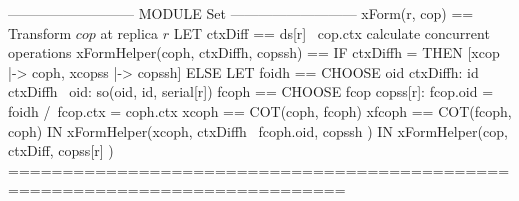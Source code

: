 \documentclass[preview, border={5pt 0pt 5pt 1pt}]{standalone}
\begin{document}
\begin{tla}
--------------------------- MODULE Set ---------------------------
xForm(r, cop) == \* Transform $cop$ at replica $r$
    LET ctxDiff == ds[r] \ cop.ctx \* calculate concurrent operations
        xFormHelper(coph, ctxDiffh, copssh) ==
            IF ctxDiffh = {} THEN [xcop |-> coph, xcopss |-> copssh]
            ELSE LET foidh == CHOOSE oid \in ctxDiffh:
                              \A id \in ctxDiffh \ {oid}: so(oid, id, serial[r]) 
                     fcoph == CHOOSE fcop \in copss[r]: 
                                fcop.oid = foidh /\ fcop.ctx = coph.ctx
                     xcoph == COT(coph, fcoph)
                    xfcoph == COT(fcoph, coph)
                 IN  xFormHelper(xcoph, ctxDiffh \ {fcoph.oid}, 
                                        copssh )
    IN  xFormHelper(cop, ctxDiff, copss[r] ) 
=============================================================================
\end{tla}
\begin{tlatex}
\@x{}\moduleLeftDash{}\moduleRightDash\@xx{}%
%
%
\@xx{}%
%
\@xx{}%
%
%
%
%
%
\@x{}\bottombar\@xx{}%
\end{tlatex}
\end{document}
